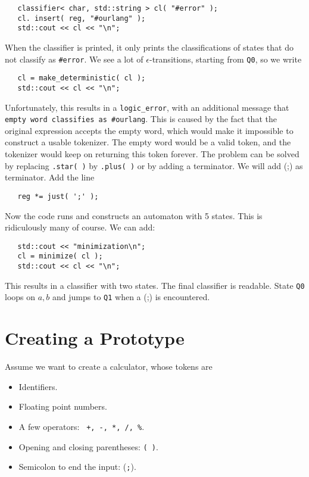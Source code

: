 \documentclass{article}
\begin{document}
\begin{verbatim}
   classifier< char, std::string > cl( "#error" );
   cl. insert( reg, "#ourlang" ); 
   std::cout << cl << "\n"; \end{verbatim}
When the classifier is printed, it only prints the
classifications of states that do not classify as
\verb+#error+. 
We see a lot of $ \epsilon $-transitions, starting
from \verb+Q0+, so we write
\begin{verbatim}
   cl = make_deterministic( cl ); 
   std::cout << cl << "\n"; \end{verbatim}
Unfortunately, this results in a \verb+logic_error+, 
with an additional message that \verb+empty word classifies as #ourlang+.
This is caused by the fact that the original
expression accepts the empty word, which would 
make it impossible to construct a usable tokenizer. 
The empty word
would be a valid token, and the tokenizer
would keep on returning this token forever. 
The problem can be solved by replacing 
\verb+.star( )+ by \verb+.plus( )+ or by adding
a terminator. We will add (;) as terminator.
Add the line 
\begin{verbatim}
   reg *= just( ';' );  \end{verbatim}
Now the code runs and constructs an automaton with
5 states. This is ridiculously many of course. 
We can add: 
\begin{verbatim}
   std::cout << "minimization\n";
   cl = minimize( cl ); 
   std::cout << cl << "\n"; \end{verbatim}
This results in a classifier with two states. 
The final classifier is readable. 
State \verb+Q0+ loops on $a,b$ and jumps to 
\verb+Q1+ when a (;) is encountered.
 
\section{Creating a Prototype} 

\noindent
Assume we want to create a calculator, whose tokens are
\begin{itemize}
\item
   Identifiers. 
\item
   Floating point numbers. 
\item
   A few operators: \  \verb|+, -, *, /, %|.
\item
   Opening and closing parentheses: \verb+( )+.
\item
   Semicolon to end the input: (\verb+;+). 
\end{itemize} 
\end{document}
